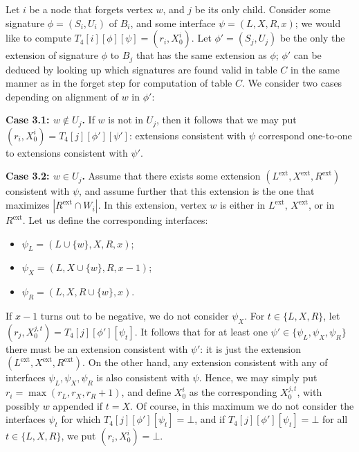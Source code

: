 \documentclass[a4paper,11pt]{article}
\theoremstyle{definition}
\theoremstyle{remark}
\newcommand{\ext}{\textrm{ext}}
\begin{document}
 Let $i$ be a node that forgets
vertex $w$, and $j$ be its only child.  Consider some signature
$\phi=(S_i,U_i)$ of $B_i$, and some interface $\psi=(L,X,R,x)$; we
would like to compute $T_4[i][\phi][\psi]=(r_i,X^i_0)$.  Let
$\phi'=(S_j,U_j)$ be the only the extension of signature $\phi$ to
$B_j$ that has the same extension as $\phi$; $\phi'$ can be deduced by
looking up which signatures are found valid in table $C$ in the same
manner as in the forget step for computation of table $C$.  We
consider two cases depending on alignment of $w$ in $\phi'$:

\vskip 0.1cm {\bf{Case 3.1: $w\notin U_j$.}} If $w$ is not in $U_j$, then
it follows that we may put $(r_i,X^i_0)=T_4[j][\phi'][\psi']$:
extensions consistent with $\psi$ correspond one-to-one to extensions
consistent with $\psi'$.

\vskip 0.1cm {\bf{Case 3.2: $w\in U_j$.}} Assume that there exists some
extension $(L^{\ext}, X^{\ext}, R^{\ext})$ consistent with $\psi$, and
assume further that this extension is the one that maximizes
$|R^{\ext}\cap W_i|$.  In this extension, vertex $w$ is either in
$L^{\ext}$, $X^{\ext}$, or in $R^{\ext}$.  Let us define the
corresponding interfaces:
\begin{itemize}
\item $\psi_L=(L\cup \{w\},X,R,x)$;
\item $\psi_X=(L,X\cup \{w\},R,x-1)$;
\item $\psi_R=(L,X,R\cup \{w\},x)$.
\end{itemize}
If $x-1$ turns out to be negative, we do not consider $\psi_X$.  For
$t\in \{L,X,R\}$, let $(r_j,X^{j,t}_0)=T_4[j][\phi'][\psi_t]$.  It
follows that for at least one $\psi'\in \{\psi_L,\psi_X,\psi_R\}$
there must be an extension consistent with $\psi'$: it is just the
extension $(L^{\ext}, X^{\ext}, R^{\ext})$.  On the other hand, any
extension consistent with any of interfaces $\psi_L,\psi_X,\psi_R$ is
also consistent with $\psi$.  Hence, we may simply put
$r_i=\max(r_L,r_X,r_R+1)$, and define $X_0^i$ as the corresponding
$X_0^{j,t}$, with possibly $w$ appended if $t=X$.  Of course, in this
maximum we do not consider the interfaces $\psi_t$ for which
$T_4[j][\phi'][\psi_t]=\bot$, and if $T_4[j][\phi'][\psi_t]=\bot$ for
all $t\in \{L,X,R\}$, we put $(r_i,X^i_0)=\bot$.

\vskip 0.3cm
\end{document}
